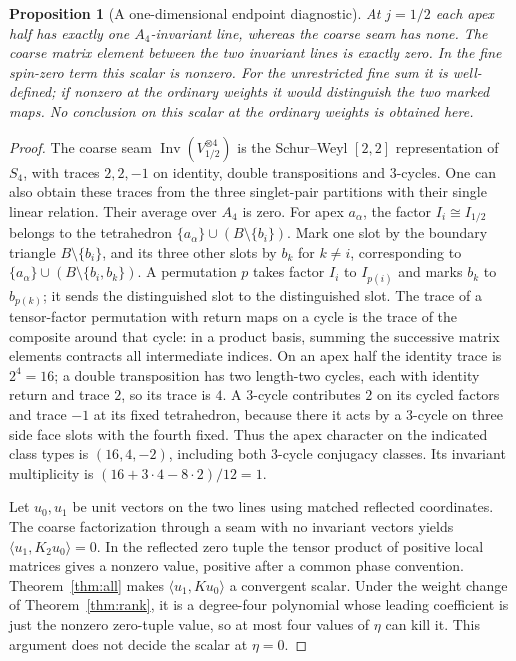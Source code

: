 \documentclass[11pt]{article}
\newtheorem{proposition}[theorem]{Proposition}
\theoremstyle{remark}
\DeclareMathOperator{\Inv}{Inv}
\begin{document}
\begin{proposition}[A one-dimensional endpoint diagnostic]\label{prop:A4}
At \(j=1/2\) each apex half has exactly one \(A_4\)-invariant line, whereas the coarse seam has none. The coarse matrix element between the two invariant lines is exactly zero. In the fine spin-zero term this scalar is nonzero. For the unrestricted fine sum it is well-defined; if nonzero at the ordinary weights it would distinguish the two marked maps. No conclusion on this scalar at the ordinary weights is obtained here.
\end{proposition}
\begin{proof}
The coarse seam \(\Inv(V_{1/2}^{\otimes4})\) is the Schur--Weyl \([2,2]\) representation of \(S_4\), with traces \(2,2,-1\) on identity, double transpositions and \(3\)-cycles. One can also obtain these traces from the three singlet-pair partitions with their single linear relation. Their average over \(A_4\) is zero. For apex \(a_\alpha\), the factor \(I_i\cong I_{1/2}\) belongs to the tetrahedron \(\{a_\alpha\}\cup(B\setminus\{b_i\})\). Mark one slot by the boundary triangle \(B\setminus\{b_i\}\), and its three other slots by \(b_k\) for \(k\ne i\), corresponding to \(\{a_\alpha\}\cup(B\setminus\{b_i,b_k\})\). A permutation \(p\) takes factor \(I_i\) to \(I_{p(i)}\) and marks \(b_k\) to \(b_{p(k)}\); it sends the distinguished slot to the distinguished slot. The trace of a tensor-factor permutation with return maps on a cycle is the trace of the composite around that cycle: in a product basis, summing the successive matrix elements contracts all intermediate indices. On an apex half the identity trace is \(2^4=16\); a double transposition has two length-two cycles, each with identity return and trace \(2\), so its trace is \(4\). A \(3\)-cycle contributes \(2\) on its cycled factors and trace \(-1\) at its fixed tetrahedron, because there it acts by a \(3\)-cycle on three side face slots with the fourth fixed. Thus the apex character on the indicated class types is \((16,4,-2)\), including both \(3\)-cycle conjugacy classes. Its invariant multiplicity is \((16+3\cdot4-8\cdot2)/12=1\).

Let \(u_0,u_1\) be unit vectors on the two lines using matched reflected coordinates. The coarse factorization through a seam with no invariant vectors yields \(\langle u_1,K_2u_0\rangle=0\). In the reflected zero tuple the tensor product of positive local matrices gives a nonzero value, positive after a common phase convention. Theorem~\ref{thm:all} makes \(\langle u_1,K u_0\rangle\) a convergent scalar. Under the weight change of Theorem~\ref{thm:rank}, it is a degree-four polynomial whose leading coefficient is just the nonzero zero-tuple value, so at most four values of \(\eta\) can kill it. This argument does not decide the scalar at \(\eta=0\).
\end{proof}
\end{document}

